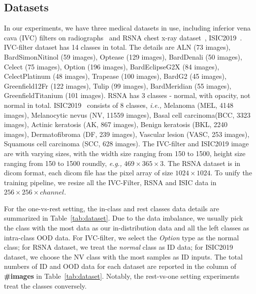 \documentclass[12pt]{spieman}  %
\begin{document}
\begin{spacing}{2}
\subsection{Datasets}
In our experiments, we have three medical datasets in use, including inferior vena cava (IVC) filters on radiographs~\cite{ni2020deep:ivc} and RSNA chest x-ray dataset~\cite{wang2017chestx}, ISIC2019~\cite{codella2018skin}. IVC-filter dataset has 14 classes in total. The details are ALN (73 images), BardSimonNitinol (59 images), Optease (129 images), BardDenali (50 images), Celect (75 images), Option (196 images), BardEclipseG2X (84 images), CelectPlatinum (48 images), Trapease (100 images), BardG2 (45 images), Greenfield12Fr (122 images), Tulip (99 images), BardMeridian (55 images), GreenfieldTitanium (101 images). RSNA has 3 classes - normal, with opacity, not normal in total. ISIC2019~\cite{codella2018skin} consists of 8 classes, \textit{i.e.,} Melanoma (MEL, 4148 images), Melanocytic nevus (NV, 11559 images), Basal cell carcinoma(BCC, 3323 images), Actinic keratosis (AK, 867 images), Benign keratosis (BKL, 2240 images), Dermatofibroma (DF, 239 images), Vascular lesion (VASC, 253 images), Squamous cell carcinoma (SCC, 628 images). The IVC-filter and ISIC2019 image are with varying sizes, with the width size ranging from 150 to 1500, height size ranging from 150 to 1500 roundly, \textit{e.g.,} $469\times365\times3$. The RSNA dataset is in dicom format, each dicom file has the pixel array of size $1024\times1024$. To unify the training pipeline, we resize all the IVC-Filter, RSNA and ISIC data in $256\times256\times channel$. 

For the one-vs-rest setting, the in-class and rest classes data details are summarized in Table~\ref{tab:dataset}. Due to the data imbalance, we usually pick the class with the most data as our in-distribution data and all the left classes as intra-class OOD data. For IVC-filter, we select the \textit{Option} type as the normal class; for RSNA dataset, we treat the \textit{normal} class as ID data; for ISIC2019 dataset, we choose the NV class with the most samples as ID inputs. The total numbers of ID and OOD data for each dataset are reported in the column of \textbf{\#images} in Table~\ref{tab:dataset}. Notably, the rest-vs-one setting experiments treat the classes conversely.


\end{spacing}
\end{document}
